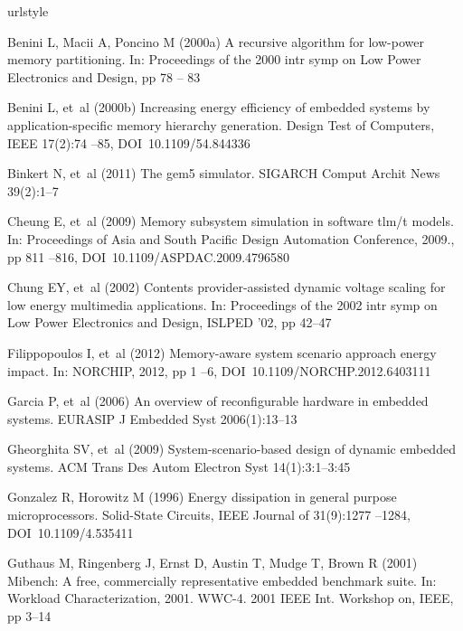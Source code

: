 \documentclass[smallcondensed]{svjour3}
\begin{document}
%
%
\begin{thebibliography}{41}
\providecommand{\natexlab}[1]{#1}
\providecommand{\url}[1]{{#1}}
\providecommand{\urlprefix}{URL }
\expandafter\ifx\csname urlstyle\endcsname\relax
  \providecommand{\doi}[1]{DOI~\discretionary{}{}{}#1}\else
  \providecommand{\doi}{DOI~\discretionary{}{}{}\begingroup
  \urlstyle{rm}\Url}\fi
\providecommand{\eprint}[2][]{\url{#2}}

Benini L, Macii A, Poncino M (2000{\natexlab{a}}) A recursive algorithm for
  low-power memory partitioning. In: Proceedings of the 2000 intr symp on Low
  Power Electronics and Design, pp 78 -- 83

Benini L, et~al (2000{\natexlab{b}}) Increasing energy efficiency of embedded
  systems by application-specific memory hierarchy generation. Design Test of
  Computers, IEEE 17(2):74 --85, \doi{10.1109/54.844336}

Binkert N, et~al (2011) The gem5 simulator. SIGARCH Comput Archit News
  39(2):1--7

Cheung E, et~al (2009) Memory subsystem simulation in software tlm/t models.
  In: Proceedings of Asia and South Pacific Design Automation Conference,
  2009., pp 811 --816, \doi{10.1109/ASPDAC.2009.4796580}

Chung EY, et~al (2002) Contents provider-assisted dynamic voltage scaling for
  low energy multimedia applications. In: Proceedings of the 2002 intr symp on
  Low Power Electronics and Design, ISLPED '02, pp 42--47

Filippopoulos I, et~al (2012) Memory-aware system scenario approach energy
  impact. In: NORCHIP, 2012, pp 1 --6, \doi{10.1109/NORCHP.2012.6403111}

Garcia P, et~al (2006) An overview of reconfigurable hardware in embedded
  systems. EURASIP J Embedded Syst 2006(1):13--13

Gheorghita SV, et~al (2009) System-scenario-based design of dynamic embedded
  systems. ACM Trans Des Autom Electron Syst 14(1):3:1--3:45

Gonzalez R, Horowitz M (1996) Energy dissipation in general purpose
  microprocessors. Solid-State Circuits, IEEE Journal of 31(9):1277 --1284,
  \doi{10.1109/4.535411}

Guthaus M, Ringenberg J, Ernst D, Austin T, Mudge T, Brown R (2001) Mibench: A
  free, commercially representative embedded benchmark suite. In: Workload
  Characterization, 2001. WWC-4. 2001 IEEE Int. Workshop on, IEEE, pp 3--14


\end{thebibliography}
\end{document}

